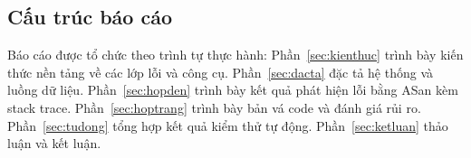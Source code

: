 \subsection{Cấu trúc báo cáo}

Báo cáo được tổ chức theo trình tự thực hành: Phần~\ref{sec:kienthuc} trình bày
kiến thức nền tảng về các lớp lỗi và công cụ. Phần~\ref{sec:dacta} đặc tả hệ
thống và luồng dữ liệu. Phần~\ref{sec:hopden} trình bày kết quả phát hiện lỗi
bằng ASan kèm stack trace. Phần~\ref{sec:hoptrang} trình bày bản vá code và
đánh giá rủi ro. Phần~\ref{sec:tudong} tổng hợp kết quả kiểm thử tự động.
Phần~\ref{sec:ketluan} thảo luận và kết luận.
